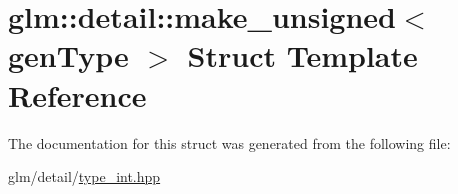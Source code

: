 \hypertarget{structglm_1_1detail_1_1make__unsigned}{\section{glm\-:\-:detail\-:\-:make\-\_\-unsigned$<$ gen\-Type $>$ Struct Template Reference}
\label{structglm_1_1detail_1_1make__unsigned}
}


The documentation for this struct was generated from the following file\-:\begin{DoxyCompactItemize}
\item 
glm/detail/\hyperlink{type__int_8hpp}{type\-\_\-int.\-hpp}\end{DoxyCompactItemize}

